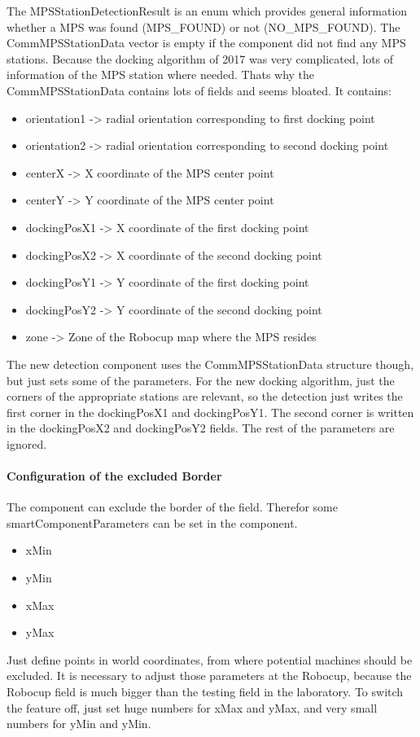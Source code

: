 The MPSStationDetectionResult is an enum which provides general information whether a MPS was found (MPS\_FOUND) or not (NO\_MPS\_FOUND).
The CommMPSStationData vector is empty if the component did not find any MPS stations. Because the docking algorithm of 2017 was very complicated, lots of information of the MPS station where needed. Thats why the CommMPSStationData contains lots of fields and seems bloated. It contains:

\begin{itemize}
\item orientation1 -> radial orientation corresponding to first docking point
\item orientation2 -> radial orientation corresponding to second docking point
\item centerX -> X coordinate of the MPS center point
\item centerY -> Y coordinate of the MPS center point
\item dockingPosX1 -> X coordinate of the first docking point
\item dockingPosX2 -> X coordinate of the second docking point
\item dockingPosY1 -> Y coordinate of the first docking point
\item dockingPosY2 -> Y coordinate of the second docking point
\item zone -> Zone of the Robocup map where the MPS resides
\end{itemize}

The new detection component uses the CommMPSStationData structure though, but just sets some of the parameters. For the new docking algorithm, just the corners of the appropriate stations are relevant, so the detection just writes the first corner in the dockingPosX1 and dockingPosY1. The second corner is written in the dockingPosX2 and dockingPosY2 fields. The rest of the parameters are ignored.

\paragraph{Configuration of the excluded Border}
The component can exclude the border of the field. Therefor some smartComponentParameters can be set in the component.
 
\begin{itemize}
\item xMin
\item yMin
\item xMax
\item yMax
\end{itemize}

Just define points in world coordinates, from where potential machines should be excluded.
It is necessary to adjust those parameters at the Robocup, because the Robocup field is much bigger than the testing field in the laboratory.
To switch the feature off, just set huge numbers for xMax and yMax, and very small numbers for yMin and yMin.







